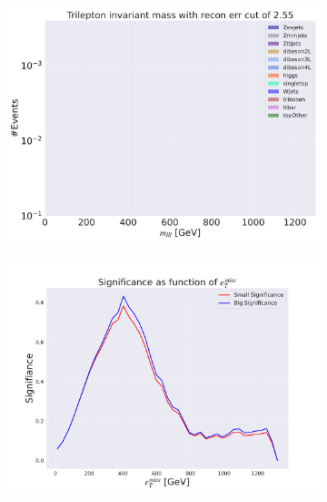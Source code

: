 \begin{figure}[H]
    \centering
    \begin{subfigure}{.45\textwidth}
        \includegraphics[width=\textwidth]{Figures/VAE_testing/big/3lep/significance_etmiss_450p0p0300.pdf}
        \caption{ }
        \label{fig:VAE_3lep_big_450_signi}
    \end{subfigure}
    \hfill
    \begin{subfigure}{.45\textwidth}
        \includegraphics[width=\textwidth]{Figures/VAE_testing/small/3lep/significance_etmiss_450p0p0300.pdf}
        \caption{}
        \label{fig:VAE_3lep_small_450_signi}
    \end{subfigure}
    \hfill
    \begin{subfigure}{.45\textwidth}

\end{subfigure}
\end{figure}
